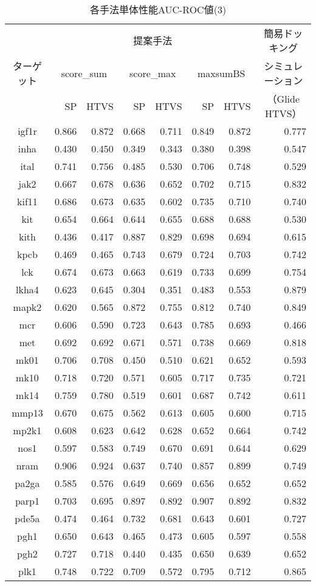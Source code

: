 \clearpage
\begin{table}[t] \centering
	\caption{各手法単体性能AUC-ROC値(3)}
	\label{table:auc:3}
	\begin{tabular}{c|rrrrrr|r}
	\hline
		&\multicolumn{6}{c|}{提案手法}&\multicolumn{1}{c}{簡易ドッキング} \\
ターゲット	&\multicolumn{2}{c}{score\_sum}&\multicolumn{2}{c}{score\_max}&\multicolumn{2}{c|}{maxsumBS}&\multicolumn{1}{c}{シミュレーション} \\
		&SP&HTVS&SP&HTVS&SP&HTVS&\multicolumn{1}{c}{（Glide HTVS）} \\
\hline
igf1r&0.866&0.872&0.668&0.711&0.849&0.872&0.777 \\
inha&0.430&0.450&0.349&0.343&0.380&0.398&0.547 \\
ital&0.741&0.756&0.485&0.530&0.706&0.748&0.529 \\
jak2&0.667&0.678&0.636&0.652&0.702&0.715&0.832 \\
kif11&0.686&0.673&0.635&0.602&0.735&0.710&0.740 \\
kit&0.654&0.664&0.644&0.655&0.688&0.688&0.530 \\
kith&0.436&0.417&0.887&0.829&0.698&0.694&0.615 \\
kpcb&0.469&0.465&0.743&0.679&0.724&0.703&0.742 \\
lck&0.674&0.673&0.663&0.619&0.733&0.699&0.754 \\
lkha4&0.623&0.645&0.304&0.351&0.483&0.553&0.879 \\
mapk2&0.620&0.565&0.872&0.755&0.812&0.740&0.849 \\
mcr&0.606&0.590&0.723&0.643&0.785&0.693&0.466 \\
met&0.692&0.692&0.671&0.571&0.738&0.669&0.818 \\
mk01&0.706&0.708&0.450&0.510&0.621&0.652&0.593 \\
mk10&0.718&0.720&0.571&0.605&0.717&0.735&0.721 \\
mk14&0.759&0.780&0.519&0.601&0.687&0.742&0.611 \\
mmp13&0.670&0.675&0.562&0.613&0.605&0.600&0.715 \\
mp2k1&0.608&0.623&0.642&0.628&0.652&0.664&0.742 \\
nos1&0.597&0.583&0.749&0.670&0.691&0.644&0.629 \\
nram&0.906&0.924&0.637&0.740&0.857&0.899&0.749 \\
pa2ga&0.585&0.576&0.649&0.669&0.656&0.652&0.652 \\
parp1&0.703&0.695&0.897&0.892&0.907&0.892&0.832 \\
pde5a&0.474&0.464&0.732&0.681&0.643&0.601&0.727 \\
pgh1&0.650&0.643&0.465&0.473&0.605&0.597&0.558 \\
pgh2&0.727&0.718&0.440&0.435&0.650&0.639&0.652 \\
plk1&0.748&0.722&0.709&0.572&0.795&0.712&0.865 \\
\hline
	\end{tabular}
\end{table}
